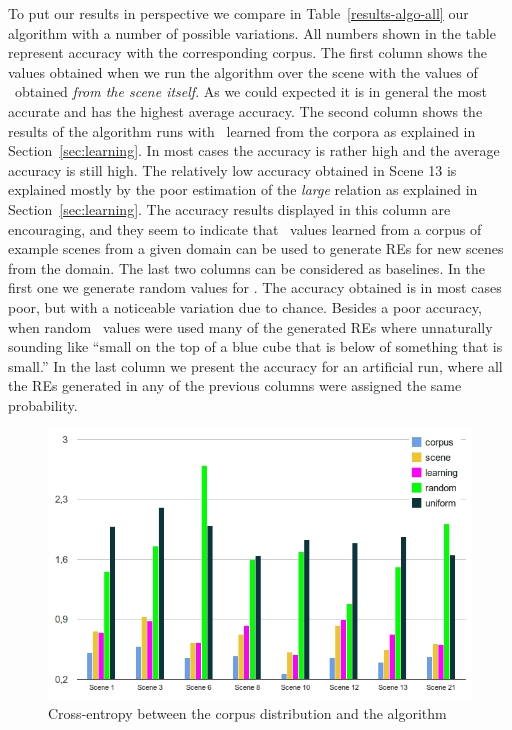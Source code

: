 To put our results in perspective we compare in Table~\ref{results-algo-all} 
our algorithm with a number of possible variations.  All numbers shown in the table 
represent accuracy with the corresponding corpus. 
The first column shows the values obtained when we run the algorithm over the scene
with the values of \puse\ obtained \emph{from the scene itself}.  As we could expected
it is in general the most accurate and has the highest average accuracy. 
%
The second column shows the results of the algorithm runs with \puse\ learned from the 
corpora as explained in Section~\ref{sec:learning}.  In most cases the accuracy 
is rather high and the average accuracy is still high. The relatively low accuracy 
obtained in Scene 13 is explained mostly by the poor estimation of the \emph{large} 
relation as explained in Section~\ref{sec:learning}.  The accuracy results displayed in this column are 
encouraging, and they seem to indicate that \puse\ values learned from a corpus of example 
scenes from a given domain can be used to generate REs for new scenes from the domain. 
%
The last two columns can be considered as baselines. In the first one we generate 
random values for \puse.  The accuracy obtained is in most cases poor, but with 
a noticeable variation due to chance. 
Besides a poor accuracy, when random \puse\ values were used many of the generated REs where unnaturally sounding like ``small 
on the top of a blue cube that is below of something that is small.'' In the last column we present the accuracy for an artificial run, where all the 
REs generated in any of the previous columns were assigned the same 
probability. 

\begin{figure}
\begin{center}
\vspace*{-.5cm}
\includegraphics[width=.5\textwidth]{images/entropy.jpg}
\end{center}
\vspace*{-.5cm}
\caption{Cross-entropy between the corpus distribution and the algorithm}\label{Entropy}
\end{figure}


